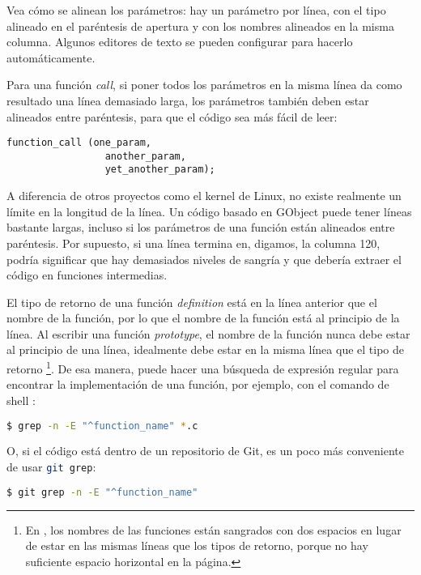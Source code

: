 Vea cómo se alinean los parámetros: hay un parámetro por línea, con el tipo alineado en el paréntesis de apertura y con los nombres alineados en la misma columna. Algunos editores de texto se pueden configurar para hacerlo automáticamente.

Para una función \emph{call}, si poner todos los parámetros en la misma línea da como resultado una línea demasiado larga, los parámetros también deben estar alineados entre paréntesis, para que el código sea más fácil de leer:

\begin{lstlisting}[style=GLib/GTK]
  function_call (one_param,
                 another_param,
                 yet_another_param);
\end{lstlisting}

A diferencia de otros proyectos como el kernel de Linux, no existe realmente un límite en la longitud de la línea. Un código basado en GObject puede tener líneas bastante largas, incluso si los parámetros de una función están alineados entre paréntesis. Por supuesto, si una línea termina en, digamos, la columna 120, podría significar que hay demasiados niveles de sangría y que debería extraer el código en funciones intermedias.

El tipo de retorno de una función \emph{definition} está en la línea anterior que el nombre de la función, por lo que el nombre de la función está al principio de la línea. Al escribir una función \emph{prototype}, el nombre de la función nunca debe estar al principio de una línea, idealmente debe estar en la misma línea que el tipo de retorno \footnote{En , los nombres de las funciones están sangrados con dos espacios en lugar de estar en las mismas líneas que los tipos de retorno, porque no hay suficiente espacio horizontal en la página.}. De esa manera, puede hacer una búsqueda de expresión regular para encontrar la implementación de una función, por ejemplo, con el comando de shell :

\begin{lstlisting}[language=bash]
$ grep -n -E "^function_name" *.c
\end{lstlisting}

O, si el código está dentro de un repositorio de Git, es un poco más conveniente de usar \lstinline[language=bash]{git grep}:

\begin{lstlisting}[language=bash]
$ git grep -n -E "^function_name"
\end{lstlisting}

